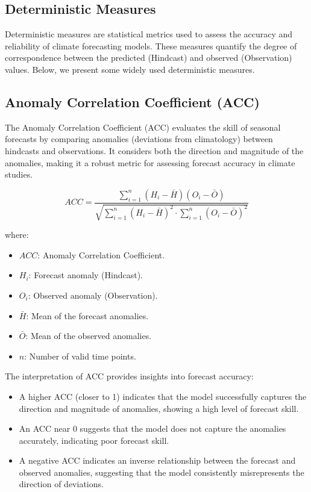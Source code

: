 \subsection{Deterministic Measures}

Deterministic measures are statistical metrics used to assess the accuracy and reliability of climate forecasting models. These measures quantify the degree of correspondence between the predicted (Hindcast) and observed (Observation) values. Below, we present some widely used deterministic measures.

\subsection{Anomaly Correlation Coefficient (ACC)}

The Anomaly Correlation Coefficient (ACC) evaluates the skill of seasonal forecasts by comparing anomalies (deviations from climatology) between hindcasts and observations. It considers both the direction and magnitude of the anomalies, making it a robust metric for assessing forecast accuracy in climate studies.

\[
ACC = \frac{\sum_{i=1}^{n} (H_i - \bar{H})(O_i - \bar{O})}{\sqrt{\sum_{i=1}^{n} (H_i - \bar{H})^2 \cdot \sum_{i=1}^{n} (O_i - \bar{O})^2}}
\]

where:  
\begin{itemize}
    \item \( ACC \): Anomaly Correlation Coefficient.  
    \item \( H_i \): Forecast anomaly (Hindcast).  
    \item \( O_i \): Observed anomaly (Observation).  
    \item \( \bar{H} \): Mean of the forecast anomalies.  
    \item \( \bar{O} \): Mean of the observed anomalies.  
    \item \( n \): Number of valid time points.  
\end{itemize}

The interpretation of ACC provides insights into forecast accuracy:  
\begin{itemize}
    \item A higher ACC (closer to 1) indicates that the model successfully captures the direction and magnitude of anomalies, showing a high level of forecast skill.  
    \item An ACC near 0 suggests that the model does not capture the anomalies accurately, indicating poor forecast skill.  
    \item A negative ACC indicates an inverse relationship between the forecast and observed anomalies, suggesting that the model consistently misrepresents the direction of deviations.  
\end{itemize}


